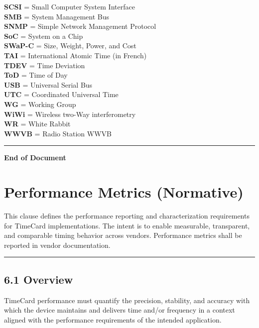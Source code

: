 \documentclass[
]{article}
\begin{document}
\textbf{SCSI} = Small Computer System Interface\\
\textbf{SMB} = System Management Bus\\
\textbf{SNMP} = Simple Network Management Protocol\\
\textbf{SoC} = System on a Chip\\
\textbf{SWaP-C} = Size, Weight, Power, and Cost\\
\textbf{TAI} = International Atomic Time (in French)\\
\textbf{TDEV} = Time Deviation\\
\textbf{ToD} = Time of Day\\
\textbf{USB} = Universal Serial Bus\\
\textbf{UTC} = Coordinated Universal Time\\
\textbf{WG} = Working Group\\
\textbf{WiWi} = Wireless two-Way interferometry\\
\textbf{WR} = White Rabbit\\
\textbf{WWVB} = Radio Station WWVB

\begin{center}\rule{0.5\linewidth}{0.5pt}\end{center}

\textbf{End of Document}

\section{Performance Metrics
(Normative)}\label{performance-metrics-normative}

This clause defines the performance reporting and characterization
requirements for TimeCard implementations. The intent is to enable
measurable, transparent, and comparable timing behavior across vendors.
Performance metrics shall be reported in vendor documentation.

\begin{center}\rule{0.5\linewidth}{0.5pt}\end{center}

\subsection{6.1 Overview}\label{overview}

TimeCard performance must quantify the precision, stability, and
accuracy with which the device maintains and delivers time and/or
frequency in a context aligned with the performance requirements of the
intended application.
\end{document}
